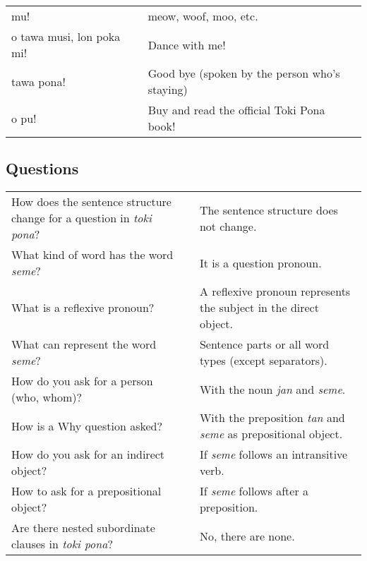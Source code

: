 \begin{supertabular}{p{5,5cm}|ll}
    mu!                       &  & meow, woof, moo, etc.                         \\
    o tawa musi, lon poka mi! &  & Dance with me!                                \\
    tawa pona!                &  & Good bye (spoken by the person who's staying) \\
    o pu!                     &  & Buy and read the official Toki Pona book!     \\
\end{supertabular}

\newpage

\subsection*{Questions}
\label{'questions_using_seme'}

\begin{supertabular}{p{5,5cm}|ll}
    How does the sentence structure change for a question in \textit{toki pona}? &  & The sentence structure does not change.                                      \\
    What kind of word has the word \textit{seme}?                                &  & It is a question pronoun.                                                    \\
    What is a reflexive pronoun?                                                 &  & A reflexive pronoun represents the subject in the direct object.             \\
    What can represent the word \textit{seme}?                                   &  & Sentence parts or all word types (except separators).                        \\
    How do you ask for a person (who, whom)?                                     &  & With the noun \textit{jan} and \textit{seme}.                                \\
    How is a Why question asked?                                                 &  & With the preposition \textit{tan} and \textit{seme} as prepositional object. \\
    How do you ask for an indirect object?                                       &  & If \textit{seme} follows an intransitive verb.                               \\
    How to ask for a prepositional object?                                       &  & If \textit{seme} follows after a preposition.                                \\
    Are there nested subordinate clauses in \textit{toki pona}?                  &  & No, there are none.                                                          \\
\end{supertabular}

